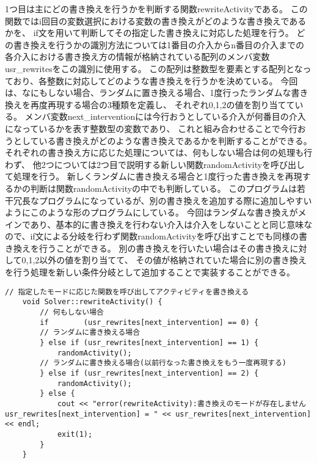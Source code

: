 1つ目は主にどの書き換えを行うかを判断する関数rewriteActivityである。
この関数ではi回目の変数選択における変数の書き換えがどのような書き換えであるかを、
if文を用いて判断してその指定した書き換えに対応した処理を行う。
どの書き換えを行うかの識別方法については1番目の介入からn番目の介入までの各介入における書き換え方の情報が格納されている配列のメンバ変数usr\_rewritesをこの識別に使用する。
この配列は整数型を要素とする配列となっており、各整数に対応してどのような書き換えを行うかを決めている。
今回は、なにもしない場合、ランダムに置き換える場合、1度行ったランダムな書き換えを再度再現する場合の3種類を定義し、
それぞれ0,1,2の値を割り当てている。
メンバ変数next\_interventionには今行おうとしている介入が何番目の介入になっているかを表す整数型の変数であり、
これと組み合わせることで今行おうとしている書き換えがどのような書き換えであるかを判断することができる。
それぞれの書き換え方に応じた処理については、何もしない場合は何の処理も行わず、
他2つについては2つ目で説明する新しい関数randomActivityを呼び出して処理を行う。
新しくランダムに書き換える場合と1度行った書き換えを再現するかの判断は関数randomActivityの中でも判断している。
このプログラムは若干冗長なプログラムになっているが、別の書き換えを追加する際に追加しやすいようにこのような形のプログラムにしている。
今回はランダムな書き換えがメインであり、基本的に書き換えを行わない介入は介入をしないことと同じ意味なので、if文による分岐を行わず関数randomActivityを呼び出すことでも同様の書き換えを行うことができる。
別の書き換えを行いたい場合はその書き換えに対して0,1,2以外の値を割り当てて、
その値が格納されていた場合に別の書き換えを行う処理を新しい条件分岐として追加することで実装することができる。
\begin{lstlisting}[caption=関数randomActivity(core/Solver.cc)]
	// 指定したモードに応じた関数を呼び出してアクティビティを書き換える
	void Solver::rewriteActivity() {
    	// 何もしない場合
    	if        (usr_rewrites[next_intervention] == 0) {
		// ランダムに書き換える場合
    	} else if (usr_rewrites[next_intervention] == 1) {
    	    randomActivity();
		// ランダムに書き換える場合(以前行なった書き換えをもう一度再現する)
    	} else if (usr_rewrites[next_intervention] == 2) {
    	    randomActivity();
    	} else {
    	    cout << "error(rewriteActivity):書き換えのモードが存在しません usr_rewrites[next_intervention] = " << usr_rewrites[next_intervention] << endl;
    	    exit(1);
    	}
	}
\end{lstlisting}

